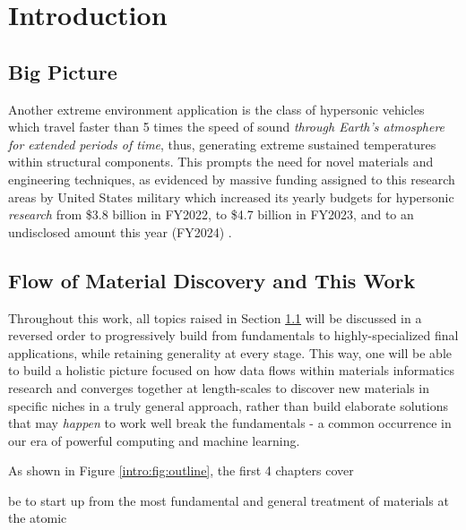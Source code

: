 \chapter{Introduction} \label{sec:Introduction}

\section{Big Picture} \label{intro:sec:bigpicture}




Another extreme environment application is the class of hypersonic vehicles which travel faster than 5 times the speed of sound \emph{through Earth's atmosphere for extended periods of time}, thus, generating extreme sustained temperatures within structural components. This prompts the need for novel materials and engineering techniques, as evidenced by massive funding assigned to this research areas by United States military which increased its yearly budgets for hypersonic \emph{research} from \$3.8 billion in FY2022, to \$4.7 billion in FY2023, and to an undisclosed amount this year (FY2024) \cite{Sayler2024HypersonicCongress}.



\cite{Krajewski2024Nimplex}





\section{Flow of Material Discovery and This Work} \label{intro:sec:flow}

Throughout this work, all topics raised in Section \ref{intro:sec:bigpicture} will be discussed in a reversed order to progressively build from fundamentals to highly-specialized final applications, while retaining generality at every stage. This way, one will be able to build a holistic picture focused on how data flows within materials informatics research and converges together at length-scales to discover new materials in specific niches in a truly general approach, rather than build elaborate solutions that may \emph{happen} to work well break the fundamentals - a common occurrence in our era of powerful computing and machine learning.

As shown in Figure \ref{intro:fig:outline}, the first 4 chapters cover 


be to start up from the most fundamental and general treatment of materials at the atomic 


